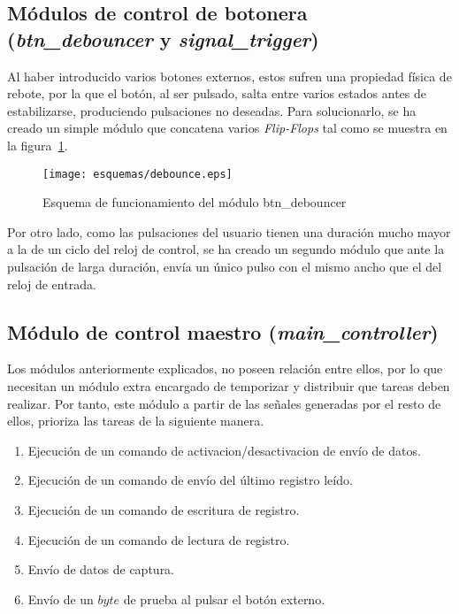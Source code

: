 \subsection{Módulos de control de botonera (\emph{btn\_debouncer} y \emph{signal\_trigger})}
Al haber introducido varios botones externos, estos sufren una propiedad física de rebote, por la que el botón, al ser pulsado, salta entre varios estados antes de estabilizarse, produciendo pulsaciones no deseadas. Para solucionarlo, se ha creado un simple módulo que concatena varios \emph{Flip-Flops} tal como se muestra en la figura~\ref{fig:esquema-debounce}.

\begin{figure}[htb]
    \centering
    \texttt{[image: esquemas/debounce.eps]}
    \caption{Esquema de funcionamiento del módulo btn\_debouncer}
    \label{fig:esquema-debounce}
\end{figure}

Por otro lado, como las pulsaciones del usuario tienen una duración mucho mayor a la de un ciclo del reloj de control, se ha creado un segundo módulo que ante la pulsación de larga duración, envía un único pulso con el mismo ancho que el del reloj de entrada.


\subsection{Módulo de control maestro (\emph{main\_controller})}
Los módulos anteriormente explicados, no poseen relación entre ellos, por lo que necesitan un módulo extra encargado de temporizar y distribuir que tareas deben realizar. Por tanto, este módulo a partir de las señales generadas por el resto de ellos, prioriza las tareas de la siguiente manera.
\begin{enumerate}
    \item Ejecución de un comando de activacion/desactivacion de envío de datos.
    \item Ejecución de un comando de envío del último registro leído.
    \item Ejecución de un comando de escritura de registro.
    \item Ejecución de un comando de lectura de registro.
    \item Envío de datos de captura.
    \item Envío de un $byte$ de prueba al pulsar el botón externo.
\end{enumerate}



